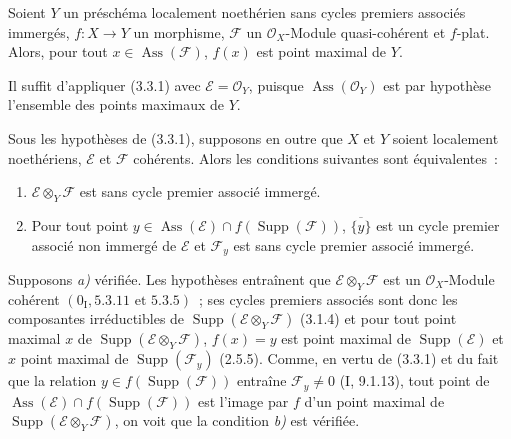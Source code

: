 \begin{corollary}[3.3.2]
\label{IV.2.3.3.2-fr}
Soient $Y$ un préschéma localement noethérien sans cycles premiers associés
immergés, $f:X\to Y$ un morphisme, $\mathcal F$ un $\mathcal O_X$-Module
quasi-cohérent et $f$-plat. Alors, pour tout
$x\in\operatorname{Ass}(\mathcal F)$, $f(x)$ est point maximal de $Y$.
\end{corollary}

Il suffit d'appliquer (3.3.1) avec $\mathcal E=\mathcal O_Y$, puisque
$\operatorname{Ass}(\mathcal O_Y)$ est par hypothèse l'ensemble des points
maximaux de $Y$.

\begin{corollary}[3.3.3]
\label{IV.2.3.3.3-fr}
Sous les hypothèses de (3.3.1), supposons en outre que $X$ et $Y$ soient
localement noethériens, $\mathcal E$ et $\mathcal F$ cohérents. Alors les
conditions suivantes sont équivalentes~:
\begin{enumerate}
\item[\emph{a)}] $\mathcal E\otimes_Y\mathcal F$ est sans cycle premier
associé immergé.
\item[\emph{b)}] Pour tout point
$y\in\operatorname{Ass}(\mathcal E)\cap f(\operatorname{Supp}(\mathcal F))$,
$\overline{\{y\}}$ est un cycle premier associé non immergé de $\mathcal E$ et
$\mathcal F_y$ est sans cycle premier associé immergé.
\end{enumerate}
\end{corollary}

Supposons \emph{a)} vérifiée. Les hypothèses entraînent que
$\mathcal E\otimes_Y\mathcal F$ est un $\mathcal O_X$-Module cohérent
$(0_{\mathrm I},5.3.11\text{ et }5.3.5)$~; ses cycles premiers associés sont
donc les composantes irréductibles de
$\operatorname{Supp}(\mathcal E\otimes_Y\mathcal F)$ (3.1.4) et pour tout
point maximal $x$ de $\operatorname{Supp}(\mathcal E\otimes_Y\mathcal F)$,
$f(x)=y$ est point maximal de $\operatorname{Supp}(\mathcal E)$ et $x$ point
maximal de $\operatorname{Supp}(\mathcal F_y)$ (2.5.5). Comme, en vertu de
(3.3.1) et du fait que la relation
$y\in f(\operatorname{Supp}(\mathcal F))$ entraîne $\mathcal F_y\ne0$
(I, 9.1.13), tout point de
$\operatorname{Ass}(\mathcal E)\cap f(\operatorname{Supp}(\mathcal F))$ est
l'image par $f$ d'un point maximal de
$\operatorname{Supp}(\mathcal E\otimes_Y\mathcal F)$, on voit que la condition
\emph{b)} est vérifiée.

